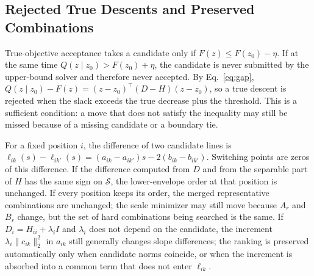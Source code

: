 \subsection{Rejected True Descents and Preserved Combinations}

True-objective acceptance takes a candidate only if $F(z)\le F(z_0)-\eta$.
If at the same time $Q(z\mid z_0)>F(z_0)+\eta$, the candidate is never submitted by the upper-bound solver and therefore never accepted.
By Eq.~\eqref{eq:gap}, $Q(z\mid z_0)-F(z)=(z-z_0)^\top(D-H)(z-z_0)$, so a true descent is rejected when the slack exceeds the true decrease plus the threshold.
This is a sufficient condition: a move that does not satisfy the inequality may still be missed because of a missing candidate or a boundary tie.

For a fixed position $i$, the difference of two candidate lines is $\ell_{ik}(s)-\ell_{ik'}(s)=(a_{ik}-a_{ik'})s-2(b_{ik}-b_{ik'})$.
Switching points are zeros of this difference. If the difference computed from $D$ and from the separable part of $H$ has the same sign on $\mathcal S$, the lower-envelope order at that position is unchanged.
If every position keeps its order, the merged representative combinations are unchanged; the scale minimizer may still move because $A_r$ and $B_r$ change, but the set of hard combinations being searched is the same.
If $D_i=H_{ii}+\lambda_i I$ and $\lambda_i$ does not depend on the candidate, the increment $\lambda_i\|c_{ik}\|_2^2$ in $a_{ik}$ still generally changes slope differences; the ranking is preserved automatically only when candidate norms coincide, or when the increment is absorbed into a common term that does not enter $\ell_{ik}$.

